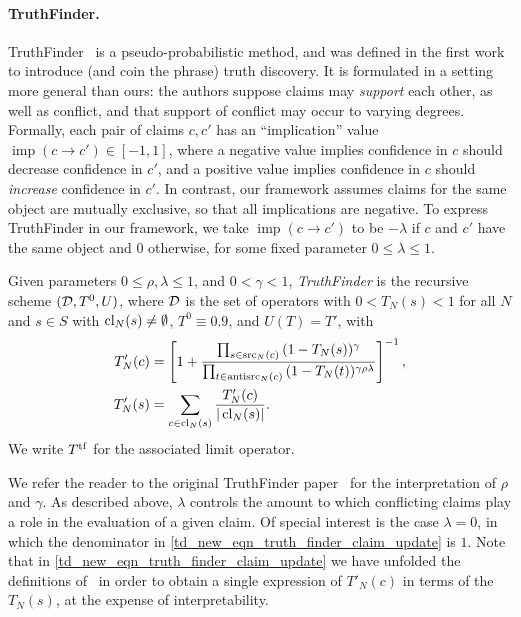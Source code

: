 \paragraph{TruthFinder.} TruthFinder~\cite{yin2008} is a pseudo-probabilistic
method, and was defined in the first work to introduce (and coin the phrase)
truth discovery. It is formulated in a setting more general than ours: the
authors suppose claims may \emph{support} each other, as well as conflict, and
that support of conflict may occur to varying degrees. Formally, each pair of
claims $c, c'$ has an ``implication'' value $\operatorname{imp}(c \to c') \in
[-1, 1]$, where a negative value implies confidence in $c$ should decrease
confidence in $c'$, and a positive value implies confidence in $c$ should
\emph{increase} confidence in $c'$. In contrast, our framework assumes claims
for the same object are mutually exclusive, so that all implications are
negative. To express TruthFinder in our framework, we take
$\operatorname{imp}(c \to c')$ to be $-\lambda$ if $c$ and $c'$ have the same
object and $0$ otherwise, for some fixed parameter $0 \le \lambda \le 1$.

\begin{definition}
    Given parameters $0 \le \rho, \lambda \le 1$, and $0 < \gamma < 1$,
    \emph{TruthFinder} is the recursive scheme $(\mathcal{D}, T^0, U)$, where $\mathcal{D}$ is
    the set of operators with $0 < T_N(s) < 1$ for all $N$ and $s \in S$ with
    $\operatorname{cl}_N(s) \ne \emptyset$, $T^0 \equiv 0.9$, and $U(T) = T'$, with
    \begin{align}
        \label{td_new_eqn_truth_finder_claim_update}
        T'_N(c) &= \left[
            1 +
            \frac{
                \prod_{s \in \operatorname{src}_N(c)}{(1 - T_N(s))^\gamma}
            }{
                \prod_{t \in \operatorname{antisrc}_N(c)}{(1 - T_N(t))^{\gamma\rho\lambda}}
            }
        \right]^{-1}, \\
        T'_N(s) &= \sum_{c \in \operatorname{cl}_N(s)}{
            \frac{T'_N(c)}{|\operatorname{cl}_N(s)|}
        }.
    \end{align}
    We write $T^{\operatorname{tf}}$ for the associated limit operator.
\end{definition}

We refer the reader to the original TruthFinder paper~\cite{yin2008} for the
interpretation of $\rho$ and $\gamma$. As described above, $\lambda$ controls
the amount to which conflicting claims play a role in the evaluation of a given
claim. Of special interest is the case $\lambda = 0$, in which the denominator
in \cref{td_new_eqn_truth_finder_claim_update} is $1$. Note that in
\cref{td_new_eqn_truth_finder_claim_update} we have unfolded the definitions
of~\cite{yin2008} in order to obtain a single expression of $T'_N(c)$ in terms
of the $T_N(s)$, at the expense of interpretability.

